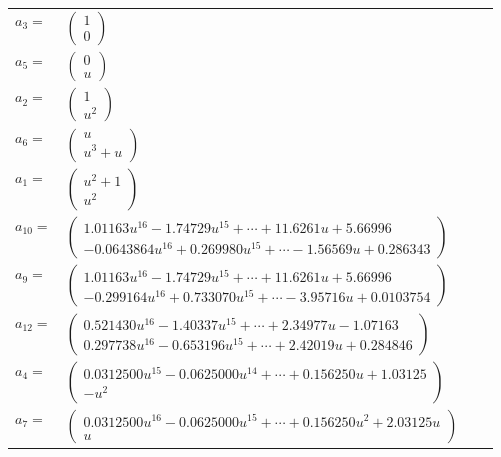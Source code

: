 \documentclass[1p]{elsarticle_modified}
\theoremstyle{definition}
\begin{document}
\begin{tabular}{m{7pt} m{180pt} m{7pt} m{180pt} }
\flushright $a_{3}=$&$\begin{pmatrix}1\\0\end{pmatrix}$ \\
\flushright $a_{5}=$&$\begin{pmatrix}0\\u\end{pmatrix}$ \\
\flushright $a_{2}=$&$\begin{pmatrix}1\\u^2\end{pmatrix}$ \\
\flushright $a_{6}=$&$\begin{pmatrix}u\\u^3+u\end{pmatrix}$ \\
\flushright $a_{1}=$&$\begin{pmatrix}u^2+1\\u^2\end{pmatrix}$ \\
\flushright $a_{10}=$&$\begin{pmatrix}1.01163 u^{16}-1.74729 u^{15}+\cdots+11.6261 u+5.66996\\-0.0643864 u^{16}+0.269980 u^{15}+\cdots-1.56569 u+0.286343\end{pmatrix}$ \\
\flushright $a_{9}=$&$\begin{pmatrix}1.01163 u^{16}-1.74729 u^{15}+\cdots+11.6261 u+5.66996\\-0.299164 u^{16}+0.733070 u^{15}+\cdots-3.95716 u+0.0103754\end{pmatrix}$ \\
\flushright $a_{12}=$&$\begin{pmatrix}0.521430 u^{16}-1.40337 u^{15}+\cdots+2.34977 u-1.07163\\0.297738 u^{16}-0.653196 u^{15}+\cdots+2.42019 u+0.284846\end{pmatrix}$ \\
\flushright $a_{4}=$&$\begin{pmatrix}0.0312500 u^{15}-0.0625000 u^{14}+\cdots+0.156250 u+1.03125\\- u^2\end{pmatrix}$ \\
\flushright $a_{7}=$&$\begin{pmatrix}0.0312500 u^{16}-0.0625000 u^{15}+\cdots+0.156250 u^{2}+2.03125 u\\u\end{pmatrix}$ \\

\end{tabular}
\end{document}
